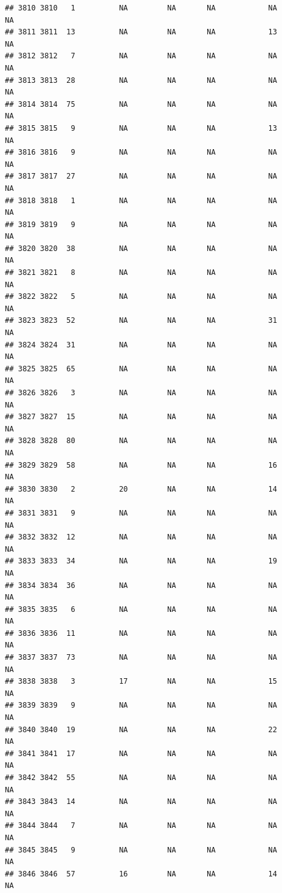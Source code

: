 \documentclass[man]{apa6}
\begin{document}
\begin{verbatim}
## 3810 3810   1          NA         NA       NA            NA       NA
## 3811 3811  13          NA         NA       NA            13       NA
## 3812 3812   7          NA         NA       NA            NA       NA
## 3813 3813  28          NA         NA       NA            NA       NA
## 3814 3814  75          NA         NA       NA            NA       NA
## 3815 3815   9          NA         NA       NA            13       NA
## 3816 3816   9          NA         NA       NA            NA       NA
## 3817 3817  27          NA         NA       NA            NA       NA
## 3818 3818   1          NA         NA       NA            NA       NA
## 3819 3819   9          NA         NA       NA            NA       NA
## 3820 3820  38          NA         NA       NA            NA       NA
## 3821 3821   8          NA         NA       NA            NA       NA
## 3822 3822   5          NA         NA       NA            NA       NA
## 3823 3823  52          NA         NA       NA            31       NA
## 3824 3824  31          NA         NA       NA            NA       NA
## 3825 3825  65          NA         NA       NA            NA       NA
## 3826 3826   3          NA         NA       NA            NA       NA
## 3827 3827  15          NA         NA       NA            NA       NA
## 3828 3828  80          NA         NA       NA            NA       NA
## 3829 3829  58          NA         NA       NA            16       NA
## 3830 3830   2          20         NA       NA            14       NA
## 3831 3831   9          NA         NA       NA            NA       NA
## 3832 3832  12          NA         NA       NA            NA       NA
## 3833 3833  34          NA         NA       NA            19       NA
## 3834 3834  36          NA         NA       NA            NA       NA
## 3835 3835   6          NA         NA       NA            NA       NA
## 3836 3836  11          NA         NA       NA            NA       NA
## 3837 3837  73          NA         NA       NA            NA       NA
## 3838 3838   3          17         NA       NA            15       NA
## 3839 3839   9          NA         NA       NA            NA       NA
## 3840 3840  19          NA         NA       NA            22       NA
## 3841 3841  17          NA         NA       NA            NA       NA
## 3842 3842  55          NA         NA       NA            NA       NA
## 3843 3843  14          NA         NA       NA            NA       NA
## 3844 3844   7          NA         NA       NA            NA       NA
## 3845 3845   9          NA         NA       NA            NA       NA
## 3846 3846  57          16         NA       NA            14       NA

\end{verbatim}
\end{document}
